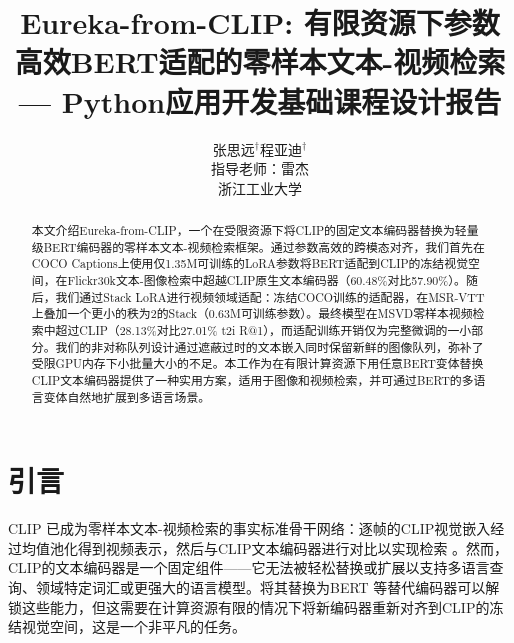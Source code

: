 \documentclass[10pt,a4paper]{ctexart}
\begin{document}
\title{Eureka-from-CLIP: 有限资源下参数高效BERT适配的零样本文本-视频检索 \\
\large --- Python应用开发基础课程设计报告}

\author{张思远$^{\dagger}$\quad 程亚迪$^{\dagger}$\\
[4pt]指导老师：雷杰\\[4pt]
  \small 浙江工业大学}

\maketitle

\let\thefootnote\relax
{}

\begin{abstract}
本文介绍Eureka-from-CLIP，一个在受限资源下将CLIP的固定文本编码器替换为轻量级BERT编码器的零样本文本-视频检索框架。通过参数高效的跨模态对齐，我们首先在COCO Captions上使用仅1.35M可训练的LoRA参数将BERT适配到CLIP的冻结视觉空间，在Flickr30k文本-图像检索中超越CLIP原生文本编码器（60.48\%对比57.90\%）。随后，我们通过Stack LoRA进行视频领域适配：冻结COCO训练的适配器，在MSR-VTT上叠加一个更小的秩为2的Stack（0.63M可训练参数）。最终模型在MSVD零样本视频检索中超过CLIP（28.13\%对比27.01\% t2i R@1），而适配训练开销仅为完整微调的一小部分。我们的非对称队列设计通过遮蔽过时的文本嵌入同时保留新鲜的图像队列，弥补了受限GPU内存下小批量大小的不足。本工作为在有限计算资源下用任意BERT变体替换CLIP文本编码器提供了一种实用方案，适用于图像和视频检索，并可通过BERT的多语言变体自然地扩展到多语言场景。
\end{abstract}

\bigskip

\section{引言}

CLIP \citep{radford2021clip}已成为零样本文本-视频检索的事实标准骨干网络：逐帧的CLIP视觉嵌入经过均值池化得到视频表示，然后与CLIP文本编码器进行对比以实现检索 \citep{luo2022clip4clip}。然而，CLIP的文本编码器是一个固定组件——它无法被轻松替换或扩展以支持多语言查询、领域特定词汇或更强大的语言模型。将其替换为BERT \citep{devlin2019bert}等替代编码器可以解锁这些能力，但这需要在计算资源有限的情况下将新编码器重新对齐到CLIP的冻结视觉空间，这是一个非平凡的任务。
\end{document}
